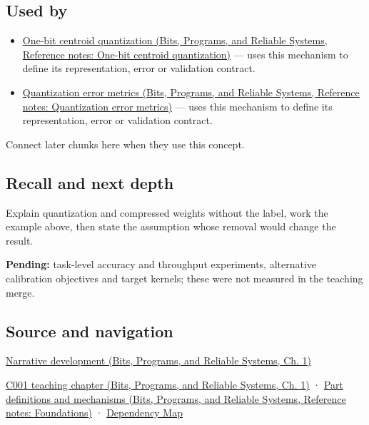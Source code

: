 \subsection{Used by}\label{appendix-fdc7879e8bf2-used-by}

\begin{itemize}
\tightlist
\item
  \href{../01-Bits-Programs-and-Reliable-Systems/main.pdf\#nameddest=appendix-4ccd7a775813}{One-bit centroid quantization (Bits, Programs, and Reliable Systems, Reference notes: One-bit centroid quantization)} --- uses this mechanism to define its representation, error or validation contract.
\item
  \href{../01-Bits-Programs-and-Reliable-Systems/main.pdf\#nameddest=appendix-537171d69d27}{Quantization error metrics (Bits, Programs, and Reliable Systems, Reference notes: Quantization error metrics)} --- uses this mechanism to define its representation, error or validation contract.
\end{itemize}

Connect later chunks here when they use this concept.

\subsection{Recall and next depth}\label{appendix-fdc7879e8bf2-recall-and-next-depth}

Explain quantization and compressed weights without the label, work the example above, then state the assumption whose removal would change the result.

\textbf{Pending:} task-level accuracy and throughput experiments, alternative calibration objectives and target kernels; these were not measured in the teaching merge.

\subsection{Source and navigation}\label{appendix-fdc7879e8bf2-source-and-navigation}

\href{../01-Bits-Programs-and-Reliable-Systems/main.pdf\#nameddest=01-foundations-i-ch001-choosing-what-information-to-keep}{Narrative development (Bits, Programs, and Reliable Systems, Ch. 1)}

\href{../01-Bits-Programs-and-Reliable-Systems/main.pdf\#nameddest=01-foundations-i-ch001-from-a-signal-to-an-interpretation}{C001 teaching chapter (Bits, Programs, and Reliable Systems, Ch. 1)} · \href{../01-Bits-Programs-and-Reliable-Systems/main.pdf\#nameddest=appendix-fd090d982a15}{Part definitions and mechanisms (Bits, Programs, and Reliable Systems, Reference notes: Foundations)} · \hyperref[appendix-4ad47bdd269a]{Dependency Map}
